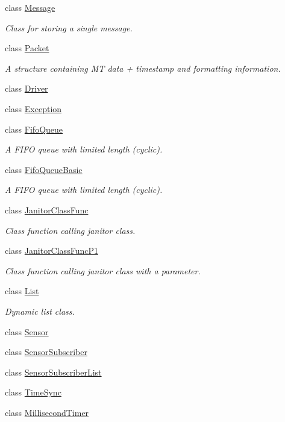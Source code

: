 \begin{DoxyCompactItemize}
class \hyperlink{classxsens_1_1Message}{\-Message}
\begin{DoxyCompactList}\small\item\em \-Class for storing a single message. \end{DoxyCompactList}\item 
class \hyperlink{classxsens_1_1Packet}{\-Packet}
\begin{DoxyCompactList}\small\item\em \-A structure containing \-M\-T data + timestamp and formatting information. \end{DoxyCompactList}\item 
class \hyperlink{classxsens_1_1Driver}{\-Driver}
\item 
class \hyperlink{classxsens_1_1Exception}{\-Exception}
\item 
class \hyperlink{classxsens_1_1FifoQueue}{\-Fifo\-Queue}
\begin{DoxyCompactList}\small\item\em \-A \-F\-I\-F\-O queue with limited length (cyclic). \end{DoxyCompactList}\item 
class \hyperlink{classxsens_1_1FifoQueueBasic}{\-Fifo\-Queue\-Basic}
\begin{DoxyCompactList}\small\item\em \-A \-F\-I\-F\-O queue with limited length (cyclic). \end{DoxyCompactList}\item 
class \hyperlink{classxsens_1_1JanitorClassFunc}{\-Janitor\-Class\-Func}
\begin{DoxyCompactList}\small\item\em \-Class function calling janitor class. \end{DoxyCompactList}\item 
class \hyperlink{classxsens_1_1JanitorClassFuncP1}{\-Janitor\-Class\-Func\-P1}
\begin{DoxyCompactList}\small\item\em \-Class function calling janitor class with a parameter. \end{DoxyCompactList}\item 
class \hyperlink{classxsens_1_1List}{\-List}
\begin{DoxyCompactList}\small\item\em \-Dynamic list class. \end{DoxyCompactList}\item 
class \hyperlink{classxsens_1_1Sensor}{\-Sensor}
\item 
class \hyperlink{classxsens_1_1SensorSubscriber}{\-Sensor\-Subscriber}
\item 
class \hyperlink{classxsens_1_1SensorSubscriberList}{\-Sensor\-Subscriber\-List}
\item 
class \hyperlink{classxsens_1_1TimeSync}{\-Time\-Sync}
\item 
class \hyperlink{classxsens_1_1MillisecondTimer}{\-Millisecond\-Timer}
\end{DoxyCompactItemize}
